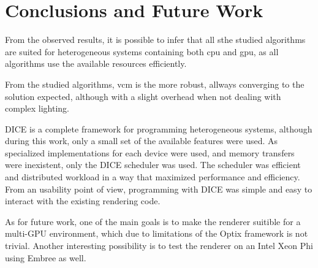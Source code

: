 \chapter{Conclusions and Future Work}








From the observed results, it is possible to infer that all sthe studied algorithms are suited for heterogeneous systems containing both \gls{cpu} and \gls{gpu}, as all algorithms use the available resources efficiently.

From the studied algorithms, \gls{vcm} is the more robust, allways converging to the solution expected, although with a slight overhead when not dealing with complex lighting.

DICE is a complete framework for programming heterogeneous systems, although during this work, only a small set of the available features were used. As specialized implementations for each device were used, and memory transfers were inexistent, only the DICE scheduler was used. The scheduler was efficient and distributed workload in a way that maximized performance and efficiency. From an usability point of view, programming with DICE was simple  and easy to interact with the existing rendering code.

As for future work, one of the main goals is to make the renderer suitible for a multi-GPU environment, which due to limitations of the Optix framework is not trivial. Another interesting possibility is to test the renderer on an Intel Xeon Phi using Embree as well.